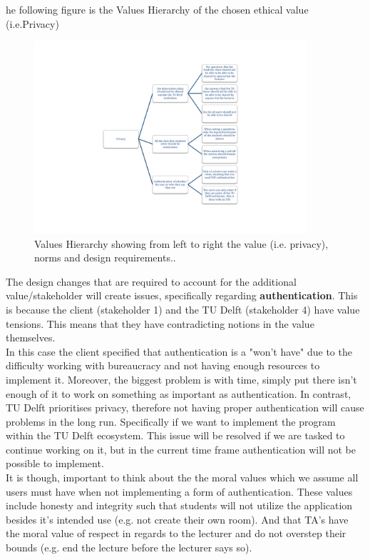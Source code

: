 \documentclass{article}
\begin{document}
    he following figure is the Values Hierarchy of the chosen ethical value (i.e.Privacy) \\

    \begin{figure}[h]
        \centering
        \includegraphics[width=0.9\textwidth]{Responsible CS_tree_v2.pdf}
        \caption{Values Hierarchy showing from left to right the value (i.e. privacy), norms and design requirements..}
        \label{fig:tree}
    \end{figure}


    The design changes that are required to account for the additional value/stakeholder will create issues, specifically regarding \textbf{authentication}. This is because the client (stakeholder 1) and the TU Delft (stakeholder 4) have value tensions. This means that they have contradicting notions in the value themselves. \\

    In this case the client specified that authentication is a "won't have" due to the difficulty working with bureaucracy and not having enough resources to implement it. Moreover, the biggest problem is with time, simply put there isn't enough of it to work on something as important as authentication. In contrast, TU Delft prioritises privacy, therefore not having proper authentication will cause problems in the long run. Specifically if we want to implement the program within the TU Delft ecosystem. This issue will be resolved if we are tasked to continue working on it, but in the current time frame authentication will not be possible to implement.\\

    It is though, important to think about the the moral values which we assume all users must have when not implementing a form of authentication. These values include honesty and integrity such that students will not utilize the application besides it's intended use (e.g. not create their own room). And that TA's have the moral value of respect in regards to the lecturer and do not overstep their bounds (e.g. end the lecture before the lecturer says so).\\
\end{document}
